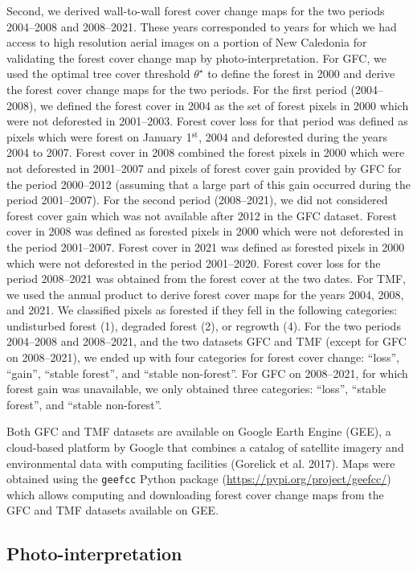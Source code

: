 \documentclass[paper=a4, fontsize=12pt, DIV=13, english, dvipsnames]{scrartcl}
\makeatletter
\newcommand{\cslcitation}[2]
 {\protect\hyper@linkstart{cite}{citeproc_bib_item_#1}#2\hyper@linkend}
\makeatother
\begin{document}
Second, we derived wall-to-wall forest cover change maps for the two periods 2004--2008 and 2008--2021. These years corresponded to years for which we had access to high resolution aerial images on a portion of New Caledonia for validating the forest cover change map by photo-interpretation. For GFC, we used the optimal tree cover threshold \(\theta^{\star}\) to define the forest in 2000 and derive the forest cover change maps for the two periods. For the first period (2004--2008), we defined the forest cover in 2004 as the set of forest pixels in 2000 which were not deforested in 2001--2003. Forest cover loss for that period was defined as pixels which were forest on January 1\(^{\text{st}}\), 2004 and deforested during the years 2004 to 2007. Forest cover in 2008 combined the forest pixels in 2000 which were not deforested in 2001--2007 and pixels of forest cover gain provided by GFC for the period 2000--2012 (assuming that a large part of this gain occurred during the period 2001--2007). For the second period (2008--2021), we did not considered forest cover gain which was not available after 2012 in the GFC dataset. Forest cover in 2008 was defined as forested pixels in 2000 which were not deforested in the period 2001--2007. Forest cover in 2021 was defined as forested pixels in 2000 which were not deforested in the period 2001--2020. Forest cover loss for the period 2008--2021 was obtained from the forest cover at the two dates. For TMF, we used the annual product to derive forest cover maps for the years 2004, 2008, and 2021. We classified pixels as forested if they fell in the following categories: undisturbed forest (1), degraded forest (2), or regrowth (4). For the two periods 2004--2008 and 2008--2021, and the two datasets GFC and TMF (except for GFC on 2008--2021), we ended up with four categories for forest cover change: ``loss'', ``gain'', ``stable forest'', and ``stable non-forest''. For GFC on 2008--2021, for which forest gain was unavailable, we only obtained three categories: ``loss'', ``stable forest'', and ``stable non-forest''.

Both GFC and TMF datasets are available on Google Earth Engine (GEE), a cloud-based platform by Google that combines a catalog of satellite imagery and environmental data with computing facilities (\cslcitation{5}{Gorelick et al. 2017}). Maps were obtained using the \texttt{geefcc} Python package (\url{https://pypi.org/project/geefcc/}) which allows computing and downloading forest cover change maps from the GFC and TMF datasets available on GEE.
\subsection{Photo-interpretation}
\label{sec:org2a76ad9}
\end{document}
